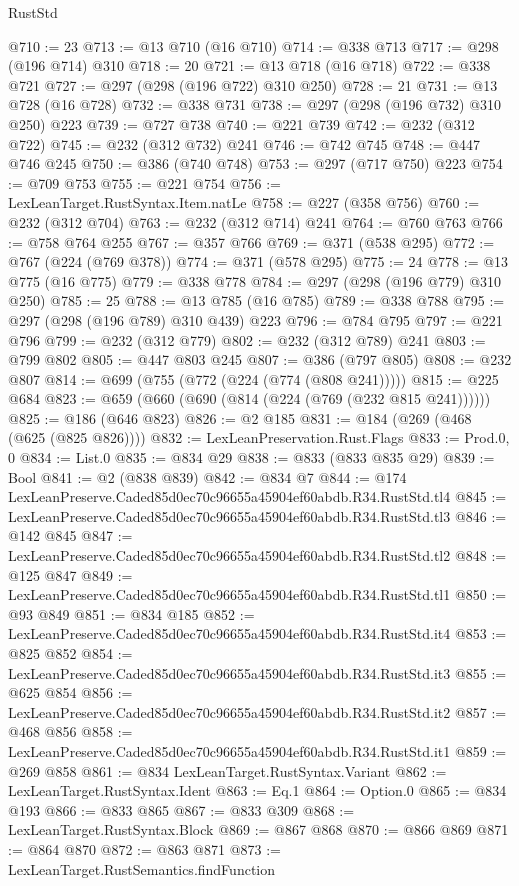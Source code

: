 \begin{lexlean}{RustStd}
\begin{coremodule}
@710 := 23
@713 := @13 @710 (@16 @710)
@714 := @338 @713
@717 := @298 (@196 @714) @310
@718 := 20
@721 := @13 @718 (@16 @718)
@722 := @338 @721
@727 := @297 (@298 (@196 @722) @310 @250)
@728 := 21
@731 := @13 @728 (@16 @728)
@732 := @338 @731
@738 := @297 (@298 (@196 @732) @310 @250) @223
@739 := @727 @738
@740 := @221 @739
@742 := @232 (@312 @722)
@745 := @232 (@312 @732) @241
@746 := @742 @745
@748 := @447 @746 @245
@750 := @386 (@740 @748)
@753 := @297 (@717 @750) @223
@754 := @709 @753
@755 := @221 @754
@756 := LexLeanTarget.RustSyntax.Item.natLe
@758 := @227 (@358 @756)
@760 := @232 (@312 @704)
@763 := @232 (@312 @714) @241
@764 := @760 @763
@766 := @758 @764 @255
@767 := @357 @766
@769 := @371 (@538 @295)
@772 := @767 (@224 (@769 @378))
@774 := @371 (@578 @295)
@775 := 24
@778 := @13 @775 (@16 @775)
@779 := @338 @778
@784 := @297 (@298 (@196 @779) @310 @250)
@785 := 25
@788 := @13 @785 (@16 @785)
@789 := @338 @788
@795 := @297 (@298 (@196 @789) @310 @439) @223
@796 := @784 @795
@797 := @221 @796
@799 := @232 (@312 @779)
@802 := @232 (@312 @789) @241
@803 := @799 @802
@805 := @447 @803 @245
@807 := @386 (@797 @805)
@808 := @232 @807
@814 := @699 (@755 (@772 (@224 (@774 (@808 @241)))))
@815 := @225 @684
@823 := @659 (@660 (@690 (@814 (@224 (@769 (@232 @815 @241))))))
@825 := @186 (@646 @823)
@826 := @2 @185
@831 := @184 (@269 (@468 (@625 (@825 @826))))
@832 := LexLeanPreservation.Rust.Flags
@833 := Prod.{0, 0}
@834 := List.{0}
@835 := @834 @29
@838 := @833 (@833 @835 @29)
@839 := Bool
@841 := @2 (@838 @839)
@842 := @834 @7
@844 := @174 LexLeanPreserve.Caded85d0ec70c96655a45904ef60abdb.R34.RustStd.tl4
@845 := LexLeanPreserve.Caded85d0ec70c96655a45904ef60abdb.R34.RustStd.tl3
@846 := @142 @845
@847 := LexLeanPreserve.Caded85d0ec70c96655a45904ef60abdb.R34.RustStd.tl2
@848 := @125 @847
@849 := LexLeanPreserve.Caded85d0ec70c96655a45904ef60abdb.R34.RustStd.tl1
@850 := @93 @849
@851 := @834 @185
@852 := LexLeanPreserve.Caded85d0ec70c96655a45904ef60abdb.R34.RustStd.it4
@853 := @825 @852
@854 := LexLeanPreserve.Caded85d0ec70c96655a45904ef60abdb.R34.RustStd.it3
@855 := @625 @854
@856 := LexLeanPreserve.Caded85d0ec70c96655a45904ef60abdb.R34.RustStd.it2
@857 := @468 @856
@858 := LexLeanPreserve.Caded85d0ec70c96655a45904ef60abdb.R34.RustStd.it1
@859 := @269 @858
@861 := @834 LexLeanTarget.RustSyntax.Variant
@862 := LexLeanTarget.RustSyntax.Ident
@863 := Eq.{1}
@864 := Option.{0}
@865 := @834 @193
@866 := @833 @865
@867 := @833 @309
@868 := LexLeanTarget.RustSyntax.Block
@869 := @867 @868
@870 := @866 @869
@871 := @864 @870
@872 := @863 @871
@873 := LexLeanTarget.RustSemantics.findFunction

\end{coremodule}
\end{lexlean}
